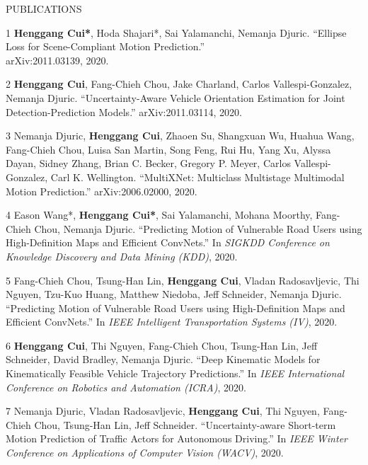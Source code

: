 \documentclass{resume} %
\begin{document}
\begin{rSection}{PUBLICATIONS}
\vspace{-.1in}
\footnotesize{
    \item
    [1]
        {\bf Henggang Cui*}, Hoda Shajari*, Sai Yalamanchi, Nemanja Djuric.
        ``Ellipse Loss for Scene-Compliant Motion Prediction.'' \\
        arXiv:2011.03139, 2020.
    \item
    [2]
        {\bf Henggang Cui}, Fang-Chieh Chou, Jake Charland, Carlos Vallespi-Gonzalez, Nemanja Djuric.
        ``Uncertainty-Aware Vehicle Orientation Estimation for Joint Detection-Prediction Models.''
        arXiv:2011.03114, 2020.
    \item
    [3]
        Nemanja Djuric, {\bf Henggang Cui}, Zhaoen Su, Shangxuan Wu, Huahua Wang, Fang-Chieh Chou, Luisa San Martin, Song Feng, Rui Hu, Yang Xu, Alyssa Dayan, Sidney Zhang, Brian C. Becker, Gregory P. Meyer, Carlos Vallespi-Gonzalez, Carl K. Wellington.
        ``MultiXNet: Multiclass Multistage Multimodal Motion Prediction.''
        arXiv:2006.02000, 2020.
    \item
    [4]
        Eason Wang*, {\bf Henggang Cui*}, Sai Yalamanchi, Mohana Moorthy, Fang-Chieh Chou, Nemanja Djuric.
        ``Predicting Motion of Vulnerable Road Users using High-Definition Maps and Efficient ConvNets.''
        In \emph{SIGKDD Conference on Knowledge Discovery and Data Mining (KDD)}, 2020.
    \item
    [5]
        Fang-Chieh Chou, Tsung-Han Lin, {\bf Henggang Cui}, Vladan Radosavljevic, Thi Nguyen, Tzu-Kuo Huang, Matthew Niedoba, Jeff Schneider, Nemanja Djuric.
        ``Predicting Motion of Vulnerable Road Users using High-Definition Maps and Efficient ConvNets.''
        In \emph{IEEE Intelligent Transportation Systems (IV)}, 2020.
    \item
    [6]
        {\bf Henggang Cui}, Thi Nguyen, Fang-Chieh Chou, Tsung-Han Lin, Jeff Schneider, David Bradley, Nemanja Djuric.
        ``Deep Kinematic Models for Kinematically Feasible Vehicle Trajectory Predictions.''
        In \emph{IEEE International Conference on Robotics and Automation (ICRA)}, 2020.
    \item
    [7]
        Nemanja Djuric, Vladan Radosavljevic, {\bf Henggang Cui}, Thi Nguyen, Fang-Chieh Chou, Tsung-Han Lin, Jeff Schneider.
        ``Uncertainty-aware Short-term Motion Prediction of Traffic Actors for Autonomous Driving.''
        In \emph{IEEE Winter Conference on Applications of Computer Vision (WACV)}, 2020.
}
\end{rSection}
\end{document}
